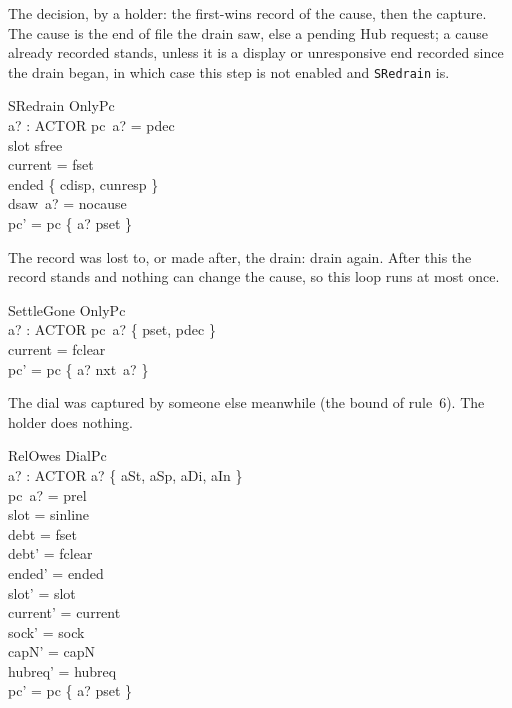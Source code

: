 \documentclass[a4paper,10pt,fleqn]{article}
\begin{document}
The decision, by a holder: the first-wins record of the cause, then the
capture.  The cause is the end of file the drain saw, else a pending Hub
request; a cause already recorded stands, unless it is a display or
unresponsive end recorded since the drain began, in which case this step is not
enabled and \texttt{SRedrain} is.

\begin{schema}{SRedrain}
  OnlyPc \\
  a? : ACTOR
\where
  pc~a? = pdec \\
  slot \neq sfree \\
  current = fset \\
  ended \in \{ cdisp, cunresp \} \\
  dsaw~a? = nocause \\
  pc' = pc \oplus \{ a? \mapsto pset \}
\end{schema}

The record was lost to, or made after, the drain: drain again.  After this the
record stands and nothing can change the cause, so this loop runs at most once.

\begin{schema}{SettleGone}
  OnlyPc \\
  a? : ACTOR
\where
  pc~a? \in \{ pset, pdec \} \\
  current = fclear \\
  pc' = pc \oplus \{ a? \mapsto nxt~a? \}
\end{schema}

The dial was captured by someone else meanwhile (the bound of rule~6).  The
holder does nothing.

\begin{schema}{RelOwes}
  DialPc \\
  a? : ACTOR
\where
  a? \in \{ aSt, aSp, aDi, aIn \} \\
  pc~a? = prel \\
  slot = sinline \\
  debt = fset \\
  debt' = fclear \\
  ended' = ended \\
  slot' = slot \\
  current' = current \\
  sock' = sock \\
  capN' = capN \\
  hubreq' = hubreq \\
  pc' = pc \oplus \{ a? \mapsto pset \}
\end{schema}
\end{document}
